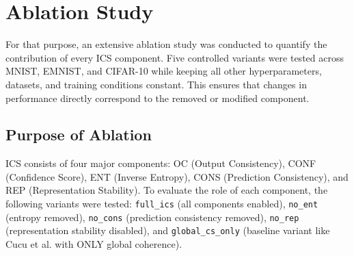 \documentclass[conference]{IEEEtran}
\begin{document}
\section{Ablation Study}
\label{sec:ablation}

For that purpose, an extensive ablation study was conducted to quantify the contribution of every ICS component. Five controlled variants were tested across MNIST, EMNIST, and CIFAR-10 while keeping all other hyperparameters, datasets, and training conditions constant. This ensures that changes in performance directly correspond to the removed or modified component.

\subsection{Purpose of Ablation}
ICS consists of four major components: OC (Output Consistency), CONF (Confidence Score), ENT (Inverse Entropy), CONS (Prediction Consistency), and REP (Representation Stability). To evaluate the role of each component, the following variants were tested: \texttt{full\_ics} (all components enabled), \texttt{no\_ent} (entropy removed), \texttt{no\_cons} (prediction consistency removed), \texttt{no\_rep} (representation stability disabled), and \texttt{global\_cs\_only} (baseline variant like Cucu et al. with ONLY global coherence).
\end{document}
